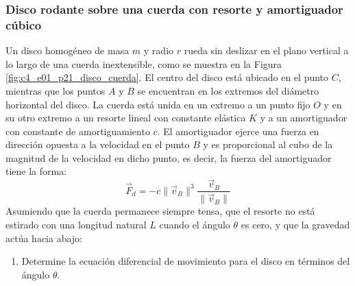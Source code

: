 \subsubsection{Disco rodante sobre una cuerda con resorte y amortiguador cúbico}

Un disco homogéneo de masa $m$ y radio $r$ rueda sin deslizar en el plano vertical a lo largo de una cuerda inextensible, como se muestra en la Figura \ref{fig:c4_e01_p21_disco_cuerda}. El centro del disco está ubicado en el punto $C$, mientras que los puntos $A$ y $B$ se encuentran en los extremos del diámetro horizontal del disco. La cuerda está unida en un extremo a un punto fijo $O$ y en su otro extremo a un resorte lineal con constante elástica $K$ y a un amortiguador con constante de amortiguamiento $c$. El amortiguador ejerce una fuerza en dirección opuesta a la velocidad en el punto $B$ y es proporcional al cubo de la magnitud de la velocidad en dicho punto, es decir, la fuerza del amortiguador tiene la forma:
\[
\vec{F}_d = -c \|\vec{v}_B\|^3 \frac{\vec{v}_B}{\|\vec{v}_B\|}
\]
Asumiendo que la cuerda permanece siempre tensa, que el resorte no está estirado con una longitud natural $L$ cuando el ángulo $\theta$ es cero, y que la gravedad actúa hacia abajo:

\begin{enumerate}
    \item Determine la ecuación diferencial de movimiento para el disco en términos del ángulo $\theta$.
\end{enumerate}

